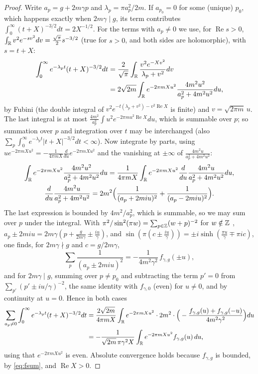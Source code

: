 \begin{proof}
Write $a_p=g+2m\gamma p$ and $\lambda_p=\pi a_p^2/2m$. If $a_{p_0}=0$ for some (unique) $p_0$, which happens exactly when $2m\gamma\mid g$, its term contributes $\int_0^\infty(t+X)^{-3/2}dt=2X^{-1/2}$. For the terms with $a_p\ne0$ we use, for $\operatorname{Re}s>0$, $\int_{\mathbb{R}} v^2e^{-sv^2}dv=\frac{\sqrt\pi}2s^{-3/2}$ (true for $s>0$, and both sides are holomorphic), with $s=t+X$:
\[
\begin{aligned}
\int_0^\infty e^{-\lambda_pt}(t+X)^{-3/2}dt&=\frac2{\sqrt\pi}\int_{\mathbb{R}}\frac{v^2e^{-Xv^2}}{\lambda_p+v^2}dv\\
&=2\sqrt{2m}\int_{\mathbb{R}} e^{-2\pi mXu^2}\frac{4m^2u^2}{a_p^2+4m^2u^2}du,
\end{aligned}
\]
by Fubini (the double integral of $v^2e^{-t(\lambda_p+v^2)-v^2\operatorname{Re}X}$ is finite) and $v=\sqrt{2\pi m}\,u$. The last integral is at most $\frac{4m^2}{a_p^2}\int u^2e^{-2\pi m u^2\operatorname{Re}X}du$, which is summable over $p$; so summation over $p$ and integration over $t$ may be interchanged (also $\sum_p\int_0^\infty e^{-\lambda_pt}|t+X|^{-3/2}dt<\infty$). Now integrate by parts, using $ue^{-2\pi mXu^2}=-\frac1{4\pi mX}\frac d{du}e^{-2\pi mXu^2}$ and the vanishing at $\pm\infty$ of $\frac{4m^2u}{a_p^2+4m^2u^2}$:
\[
\begin{gathered}
\int_{\mathbb{R}} e^{-2\pi mXu^2}\frac{4m^2u^2}{a_p^2+4m^2u^2}du=\frac1{4\pi mX}\int_{\mathbb{R}} e^{-2\pi mXu^2}\frac d{du}\frac{4m^2u}{a_p^2+4m^2u^2}du,\\
\frac d{du}\frac{4m^2u}{a_p^2+4m^2u^2}=2m^2\Big(\frac1{(a_p+2miu)^2}+\frac1{(a_p-2miu)^2}\Big).
\end{gathered}
\]
The last expression is bounded by $4m^2/a_p^2$, which is summable, so we may sum over $p$ under the integral. With $\pi^2/\sin^2(\pi w)=\sum_{p\in\mathbb{Z}}(w+p)^{-2}$ for $w\notin\mathbb{Z}$ \cite[Chapter~5, \S2.1]{Ahl79}, $a_p\pm2miu=2m\gamma(p+\frac g{2m\gamma}\pm\frac{iu}\gamma)$, and $\sin(\pi(c\pm\frac{iu}\gamma))=\pm i\sinh(\frac{\pi u}\gamma\mp\pi ic)$, one finds, for $2m\gamma\nmid g$ and $c=g/2m\gamma$,
\[
\sum_{p}\frac1{(a_p\pm2miu)^2}=-\frac{1}{4m^2\gamma^2}\,f_{\gamma,g}(\pm u),
\]
and for $2m\gamma\mid g$, summing over $p\ne p_0$ and subtracting the term $p'=0$ from $\sum_{p'}(p'\pm iu/\gamma)^{-2}$, the same identity with $f_{\gamma,0}$ (even) for $u\ne0$, and by continuity at $u=0$. Hence in both cases
\[
\begin{aligned}
\sum_{a_p\ne0}\int_0^\infty e^{-\lambda_pt}(t+X)^{-3/2}dt&=\frac{2\sqrt{2m}}{4\pi mX}\int_{\mathbb{R}} e^{-2\pi mXu^2}\cdot2m^2\cdot\Big(-\frac{f_{\gamma,g}(u)+f_{\gamma,g}(-u)}{4m^2\gamma^2}\Big)du\\
&=-\frac{1}{\sqrt{2m}\,\pi\gamma^2X}\int_{\mathbb{R}} e^{-2\pi mXu^2}f_{\gamma,g}(u)\,du,
\end{aligned}
\]
using that $e^{-2\pi mXu^2}$ is even. Absolute convergence holds because $f_{\gamma,g}$ is bounded, by \eqref{eq:fsum}, and $\operatorname{Re}X>0$.
\end{proof}

